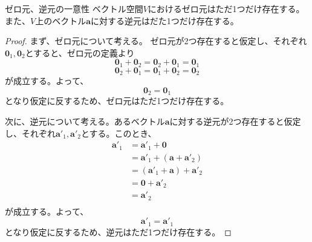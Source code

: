 \begin{theorem*}{ゼロ元、逆元の一意性}
	ベクトル空間\(V\)におけるゼロ元はただ1つだけ存在する。また、\(V\)上のベクトル\(\boldsymbol{a}\)に対する逆元はだた1つだけ存在する。
\end{theorem*}
\begin{proof}
	まず、ゼロ元について考える。
	ゼロ元が2つ存在すると仮定し、それぞれ\(\boldsymbol{0}_1,\boldsymbol{0}_2\)とすると、ゼロ元の定義より
	\begin{equation}
		\boldsymbol{0}_1+\boldsymbol{0}_2=\boldsymbol{0}_2+\boldsymbol{0}_1=\boldsymbol{0}_1
	\end{equation}
	\begin{equation}
		\boldsymbol{0}_2+\boldsymbol{0}_1=\boldsymbol{0}_1+\boldsymbol{0}_2=\boldsymbol{0}_2
	\end{equation}
	が成立する。よって、
	\begin{equation}
		\boldsymbol{0}_2=\boldsymbol{0}_1
	\end{equation}
	となり仮定に反するため、ゼロ元はただ1つだけ存在する。

	次に、逆元について考える。あるベクトル\(\boldsymbol{a}\)に対する逆元が2つ存在すると仮定し、それぞれ\(\boldsymbol{a}'_1,\boldsymbol{a}'_2\)とする。このとき、
	\begin{equation}
		\begin{split}
			\boldsymbol{a}'_1 &=  \boldsymbol{a}'_1+\boldsymbol{0} \\
			&= \boldsymbol{a}'_1+(\boldsymbol{a}+\boldsymbol{a}'_2) \\
			&=(\boldsymbol{a}'_1+\boldsymbol{a})+\boldsymbol{a}'_2 \\
			&=\boldsymbol{0}+\boldsymbol{a}'_2 \\
			&=\boldsymbol{a}'_2 \\
		\end{split}
	\end{equation}
	が成立する。よって、
	\begin{equation}
		\boldsymbol{a}'_1=\boldsymbol{a}'_1
	\end{equation}
	となり仮定に反するため、逆元はただ1つだけ存在する。
\end{proof}

